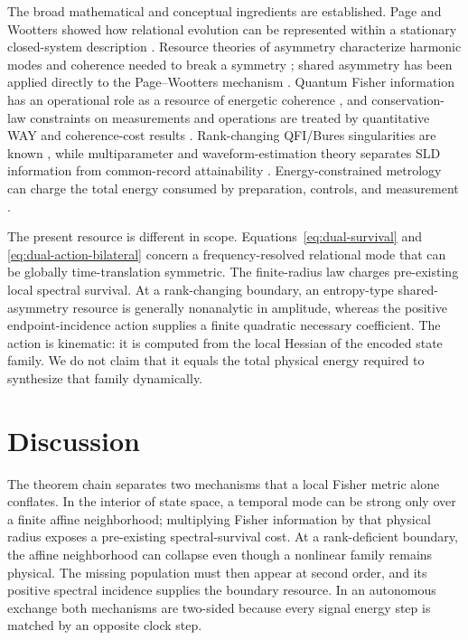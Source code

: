 \documentclass[aps,pra,preprint,nofootinbib]{revtex4-2}
\begin{document}
The broad mathematical and conceptual ingredients are established. Page and Wootters showed how relational evolution can be represented within a stationary closed-system description \cite{PageWootters1983}. Resource theories of asymmetry characterize harmonic modes and coherence needed to break a symmetry \cite{MarvianSpekkens2014Modes}; shared asymmetry has been applied directly to the Page--Wootters mechanism \cite{CarmoSoaresPinto2021}. Quantum Fisher information has an operational role as a resource of energetic coherence \cite{Marvian2022,YamaguchiTajima2023}, and conservation-law constraints on measurements and operations are treated by quantitative WAY and coherence-cost results \cite{MarvianSpekkensWAY2012,TajimaShiraishiSaito2020}. Rank-changing QFI/Bures singularities are known \cite{Safranek2017}, while multiparameter and waveform-estimation theory separates SLD information from common-record attainability \cite{GillMassar2000,LiEtAl2016,GardnerEtAl2024}. Energy-constrained metrology can charge the total energy consumed by preparation, controls, and measurement \cite{ChenYang2026}.

The present resource is different in scope. Equations~\eqref{eq:dual-survival} and \eqref{eq:dual-action-bilateral} concern a frequency-resolved relational mode that can be globally time-translation symmetric. The finite-radius law charges pre-existing local spectral survival. At a rank-changing boundary, an entropy-type shared-asymmetry resource is generally nonanalytic in amplitude, whereas the positive endpoint-incidence action supplies a finite quadratic necessary coefficient. The action is kinematic: it is computed from the local Hessian of the encoded state family. We do not claim that it equals the total physical energy required to synthesize that family dynamically.

\section{Discussion}
\label{sec:discussion}

The theorem chain separates two mechanisms that a local Fisher metric alone conflates. In the interior of state space, a temporal mode can be strong only over a finite affine neighborhood; multiplying Fisher information by that physical radius exposes a pre-existing spectral-survival cost. At a rank-deficient boundary, the affine neighborhood can collapse even though a nonlinear family remains physical. The missing population must then appear at second order, and its positive spectral incidence supplies the boundary resource. In an autonomous exchange both mechanisms are two-sided because every signal energy step is matched by an opposite clock step.
\end{document}
